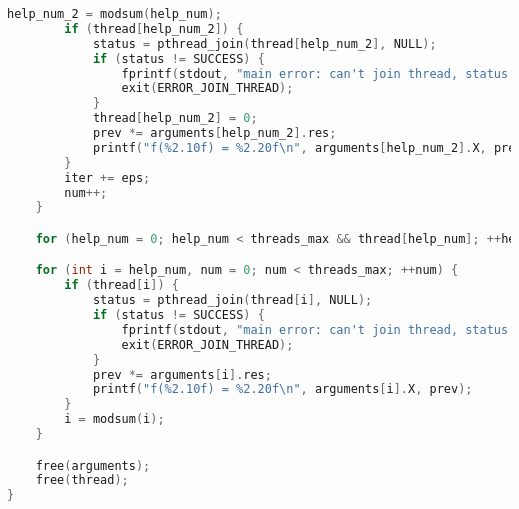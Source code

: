 \documentclass[12pt]{article}
\begin{document}
{\begin{lstlisting}[escapechar=@,language=c]
        help_num_2 = modsum(help_num);
        if (thread[help_num_2]) {
            status = pthread_join(thread[help_num_2], NULL);
            if (status != SUCCESS) {
                fprintf(stdout, "main error: can't join thread, status = %d\n", status);
                exit(ERROR_JOIN_THREAD);
            }
            thread[help_num_2] = 0;
            prev *= arguments[help_num_2].res;
            printf("f(%2.10f) = %2.20f\n", arguments[help_num_2].X, prev);
        }
        iter += eps;
        num++;
    }

    for (help_num = 0; help_num < threads_max && thread[help_num]; ++help_num);

    for (int i = help_num, num = 0; num < threads_max; ++num) {
        if (thread[i]) {
            status = pthread_join(thread[i], NULL);
            if (status != SUCCESS) {
                fprintf(stdout, "main error: can't join thread, status = %d\n", status);
                exit(ERROR_JOIN_THREAD);
            }
            prev *= arguments[i].res;
            printf("f(%2.10f) = %2.20f\n", arguments[i].X, prev);
        }
        i = modsum(i);
    }

    free(arguments);
    free(thread);
}  
\end{lstlisting}}
%
%
%
\end{document}
